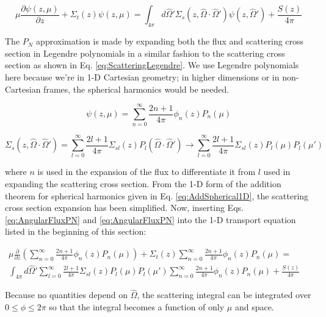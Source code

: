 \documentclass[10pt]{article}
\newcommand{\hO}{\hat{\Omega}}
\begin{document}
\begin{flushleft}
\begin{equation*}
\mu \frac{\partial \psi(z, \mu)}{\partial z} +
 \Sigma_t(z)\psi(z, \mu) =\int_{4\pi}^{} d\hO  ' \Sigma_s(z, \hO  \cdot\hO  ')\psi(z,\hO  ') + \frac{S(z)}{4\pi}
 \end{equation*}

The \(P_N\) approximation is made by expanding both the flux and scattering cross section in Legendre polynomials in a similar fashion to the scattering cross section as shown in Eq. \eqref{eq:ScatteringLegendre}. We use Legendre polynomials here because we're in 1-D Cartesian geometry; in higher dimensions or in non-Cartesian frames, the spherical harmonics would be needed.

\begin{equation}
\label{eq:AngularFluxPN}
\psi(z,\mu)=\sum_{n=0}^{\infty}\frac{2n+1}{4\pi}\phi_n(z)P_n(\mu)
\end{equation}

\begin{equation}
\label{eq:PNScatteringCrossSectionExpansion}
\Sigma_s(z,\hO  \cdot\hO  ')=\sum_{l=0}^{\infty}\frac{2l+1}{4\pi}\Sigma_{sl}(z)P_l(\hO  \cdot\hO  ')\rightarrow\sum_{l=0}^{\infty}\frac{2l+1}{4\pi}\Sigma_{sl}(z)P_l(\mu)P_l(\mu')
\end{equation}

where \(n\) is used in the expansion of the flux to differentiate it from \(l\) used in expanding the scattering cross section. From the 1-D form of the addition theorem for spherical harmonics given in Eq. \eqref{eq:AddSpherical1D}, the scattering cross section expansion has been simplified. Now, inserting Eqs. \eqref{eq:AngularFluxPN} and \eqref{eq:AngularFluxPN} into the 1-D transport equation listed in the beginning of this section:

\begin{equation}
\begin{aligned}
\mu \frac{\partial}{\partial z}\left(\sum_{n=0}^{\infty}\frac{2n+1}{4\pi}\phi_n(z)P_n(\mu)\right) + \Sigma_t(z)\sum_{n=0}^{\infty}\frac{2n+1}{4\pi}\phi_n(z)P_n(\mu) =\quad\quad\\
\int_{4\pi}^{} d\hO  ' \sum_{l=0}^{\infty}\frac{2l+1}{4\pi}\Sigma_{sl}(z)P_l(\mu)P_l(\mu')\sum_{n=0}^{\infty}\frac{2n+1}{4\pi}\phi_n(z)P_n(\mu) + \frac{S(z)}{4\pi}
 \end{aligned}
 \end{equation}

Because no quantities depend on \(\hO  \), the scattering integral can be integrated over \(0\leq\phi\leq2\pi\) so that the integral becomes a function of only \(\mu\) and space.


\end{flushleft}
\end{document}

